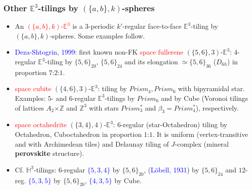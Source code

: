 \documentclass{beamer}
\begin{document}
\begin{frame}\frametitle{Other  $\mathbb{E}^3$-tilings by $(\{a,b\},k)$-spheres}
\vspace{-2mm}

\begin{itemize}

\item
An \textcolor{red}{$(\{a,b\},k)$-$\mathbb{E}^3$} is a $3$-periodic $k'$-regular face-to-face 
$\mathbb{E}^3$-tiling
by $(\{a,b\},k)$-spheres. Some examples follow.
\item
\textcolor{blue}{Deza-Shtogrin, 1999}: first  known non-FK \textcolor{red}{space 
fullerene} 
$(\{5,6\},3)$-$\mathbb{E}^3$: $4$-regular
 $\mathbb{E}^3$-tiling by $\{5,6\}_{20}$, $\{5,6\}_{24}$ and its elongation $\simeq \{5,6\}_{36}$ 
($D_{6h}$) in proportion $7$:$2$:$1$.\pause

\item 
\textcolor{red}{space cubite} $(\{4,6\},3)$-$\mathbb{E}^3$: tiling  by 
$Prism_4, Prism_6$ with bipyramidal
star. Examples: 
$5$- and $6$-regular 
 $\mathbb{E}^3$-tilings by 
$Prism_6$ and by Cube (Voronoi 
tilings 
of lattices $A_2 $$\times $$ \mathbb{Z}$ and  $ \mathbb{Z}^3$ 
with  
stars 
$Prism_3^{*}$ and $\beta_3=Prism_4^{*}$), respectively.
\pause

\item
\textcolor{red}{space octahedrite} $(\{3,4\},4)$-$\mathbb{E}^3$: 
$6$-regular 
 (star-Octahedron) tiling by Octahedron, Cuboctahedron
in proportion
$1$:$1$. It is 
uniform (vertex-transitive and with Archimedean tiles)
and Delaunay tiling of
$J$-complex (mineral {\bf perovskite} structure). 
\item
Cf. $\mathbb{H}^3$-tilings: $6$-regular \textcolor{blue}{$\{5,3,4\}$} by
 $\{5,6\}_{20}$, 
(\textcolor{blue}{L\"obell, 1931}) by 
$\{5,6\}_{24}$ and $12$-reg.  
\textcolor{blue}{$\{5,3,5\}$} by 
 $\{5,6\}_{20}$, 
\textcolor{blue}{$\{4,3,5\}$}  by
 Cube.



\end{itemize}
\end{frame}
\end{document}

